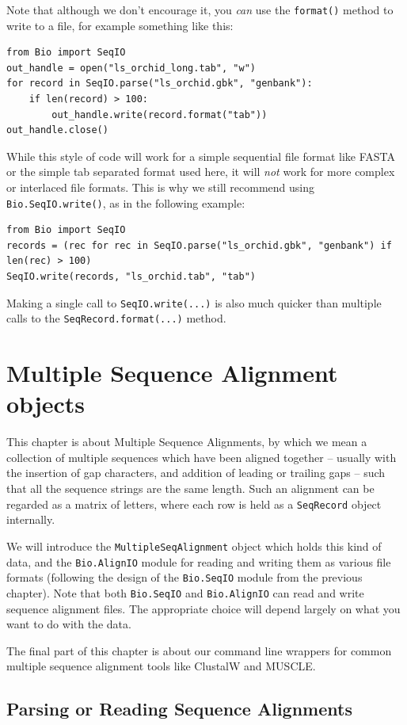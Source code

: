\documentclass{report}
\begin{document}
Note that although we don't encourage it, you \emph{can} use the \verb|format()| method to write to a file, for example something like this:
\begin{verbatim}
from Bio import SeqIO
out_handle = open("ls_orchid_long.tab", "w")
for record in SeqIO.parse("ls_orchid.gbk", "genbank"):
    if len(record) > 100:
        out_handle.write(record.format("tab"))
out_handle.close()
\end{verbatim}
\noindent While this style of code will work for a simple sequential file format like FASTA or the simple tab separated format used here, it will \emph{not} work for more complex or interlaced file formats.  This is why we still recommend using \verb|Bio.SeqIO.write()|, as in the following example:
\begin{verbatim}
from Bio import SeqIO
records = (rec for rec in SeqIO.parse("ls_orchid.gbk", "genbank") if len(rec) > 100)
SeqIO.write(records, "ls_orchid.tab", "tab")
\end{verbatim}
\noindent Making a single call to \verb|SeqIO.write(...)| is also much quicker than
multiple calls to the \verb|SeqRecord.format(...)| method.

\chapter{Multiple Sequence Alignment objects}
\label{chapter:Bio.AlignIO}

This chapter is about Multiple Sequence Alignments, by which we mean a collection of
multiple sequences which have been aligned together -- usually with the insertion of gap
characters, and addition of leading or trailing gaps -- such that all the sequence
strings are the same length. Such an alignment can be regarded as a matrix of letters,
where each row is held as a \verb|SeqRecord| object internally.

We will introduce the \verb|MultipleSeqAlignment| object which holds this kind of data,
and the \verb|Bio.AlignIO| module for reading and writing them as various file formats
(following the design of the \verb|Bio.SeqIO| module from the previous chapter).
Note that both \verb|Bio.SeqIO| and \verb|Bio.AlignIO| can read and write sequence
alignment files.  The appropriate choice will depend largely on what you want to do
with the data.

The final part of this chapter is about our command line wrappers for common multiple
sequence alignment tools like ClustalW and MUSCLE.

\section{Parsing or Reading Sequence Alignments}
\end{document}
